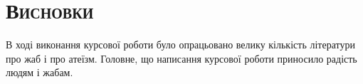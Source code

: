 
\newpage
\chapter*{\textsc{Висновки}}

В ході виконання курсової роботи було опрацьовано велику кількість літератури про жаб і про атеїзм.
Головне, що написання курсової роботи приносило радість людям і жабам.